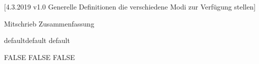 [4.3.2019 v1.0 Generelle Definitionen die verschiedene Modi zur Verfügung stellen]



\providecommand{\LILLYxMODE}{default}
\providecommand\LILLYxMODExDEFAULT{default}
\providecommand\LILLYxMODExDUMMY{dummy}

\providecommand{\LILLYxBOXxMODE}{DEFAULT}
\providecommand{\LILLYxFOOTERxBUTTONS}{TRUE}

\def\LILLY@Typ@Mitschrieb{Mitschrieb}
\def\LILLY@Typ@Uebungsblatt{Uebungsblatt}
\def\LILLY@Typ@Dokumentation{Dokumentation}
\def\LILLY@Typ@Zusammenfassung{Zusammenfassung}

\ifx\LILLY@Typ\LILLY@Typ@Mitschrieb
    \providecommand{\LILLYxBOXxAufgabexBox}{FALSE}
\fi
\ifx\LILLY@Typ\LILLY@Typ@Zusammenfassung
\RequirePackage{imakeidx} %
\fi

\ifx\LILLYxMODE\LILLYxMODExDEFAULT
    \providecommand\LILLYxBOXxBeispielxBox{FALSE}
\else\ifx\LILLYxMODE\LILLYxMODExPRINT
    \renewcommand{\LILLYxFOOTERxBUTTONS}{FALSE}
    \providecommand{\LILLYxHYPERLINK}{FALSE}
    \providecommand\LILLYxBOXxBemerkungxBox{FALSE}
    \providecommand\LILLYxBOXxBeweisxBox{FALSE}
    \providecommand\LILLYxBOXxBeispielxBox{FALSE}
    \providecommand\LILLYxBOXxLemmaxBox{FALSE}
    \raggedbottom  %
\fi\fi


\ifx\LILLYxMODExEXTRA\true %
\else
\fi


\ifx\LILLYxBOXxBeispielxBox\false\renewcommand{\LILLYxColorxBeispiel}{\LILLYxLINKSxMainColor}\fi
\ifx\LILLYxBOXxBeweisxBox\false\renewcommand{\LILLYxColorxBeweis}{\LILLYxLINKSxMainColor}\fi
\ifx\LILLYxBOXxBemerkungxBox\false\renewcommand{\LILLYxColorxBemerkung}{\LILLYxLINKSxMainColor}\fi





